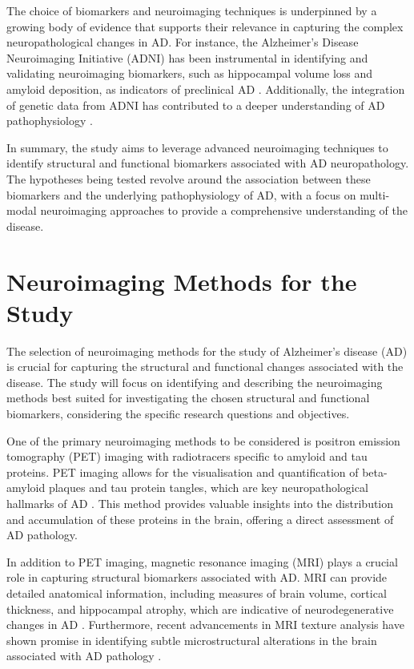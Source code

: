 \documentclass[10pt]{article}
\begin{document}
\begin{sloppypar}
  The choice of biomarkers and neuroimaging techniques is underpinned by a growing body of evidence that supports their relevance in capturing the complex neuropathological changes in AD. For instance, the Alzheimer's Disease Neuroimaging Initiative (ADNI) has been instrumental in identifying and validating neuroimaging biomarkers, such as hippocampal volume loss and amyloid deposition, as indicators of preclinical AD \citep{saykin_genetic_2015}. Additionally, the integration of genetic data from ADNI has contributed to a deeper understanding of AD pathophysiology \citep{saykin_genetic_2015}.

  In summary, the study aims to leverage advanced neuroimaging techniques to identify structural and functional biomarkers associated with AD neuropathology. The hypotheses being tested revolve around the association between these biomarkers and the underlying pathophysiology of AD, with a focus on multi-modal neuroimaging approaches to provide a comprehensive understanding of the disease.

  \section{Neuroimaging Methods for the Study}
  \label{sec:neuroimaging-methods}

  The selection of neuroimaging methods for the study of Alzheimer's disease (AD) is crucial for capturing the structural and functional changes associated with the disease. The study will focus on identifying and describing the neuroimaging methods best suited for investigating the chosen structural and functional biomarkers, considering the specific research questions and objectives.

  One of the primary neuroimaging methods to be considered is positron emission tomography (PET) imaging with radiotracers specific to amyloid and tau proteins. PET imaging allows for the visualisation and quantification of beta-amyloid plaques and tau protein tangles, which are key neuropathological hallmarks of AD \citep{jack_serial_2009}. This method provides valuable insights into the distribution and accumulation of these proteins in the brain, offering a direct assessment of AD pathology.

  In addition to PET imaging, magnetic resonance imaging (MRI) plays a crucial role in capturing structural biomarkers associated with AD. MRI can provide detailed anatomical information, including measures of brain volume, cortical thickness, and hippocampal atrophy, which are indicative of neurodegenerative changes in AD \citep{cai_magnetic_2020}. Furthermore, recent advancements in MRI texture analysis have shown promise in identifying subtle microstructural alterations in the brain associated with AD pathology \citep{cai_magnetic_2020}.


\end{sloppypar}
\end{document}
